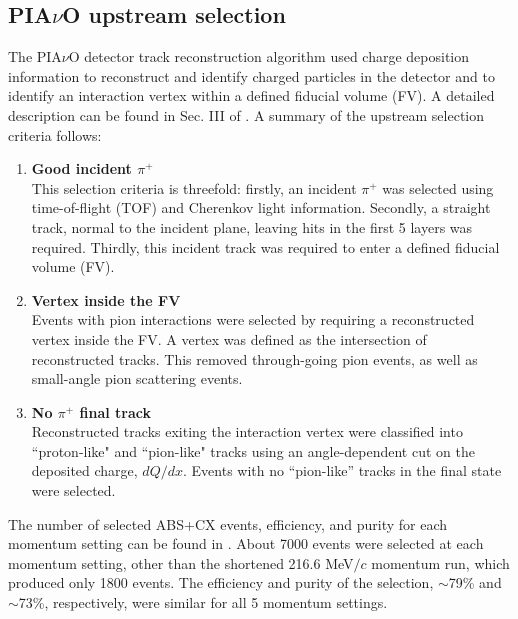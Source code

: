 \subsection{PIA$\nu$O upstream selection}
The PIA$\nu$O detector track reconstruction algorithm used charge deposition information to reconstruct and identify charged particles in the detector and to identify an interaction vertex within a defined fiducial volume (FV). A detailed description can be found in Sec. III of \cite{duet}. A summary of the upstream selection criteria follows:
\begin{enumerate}
\item {\bf Good incident $\pi^{+}$\\}
This selection criteria is threefold: firstly, an incident $\pi^{+}$ was selected using {\color{red}time-of-flight} (TOF) and Cherenkov light information. Secondly, a straight track, normal to the incident plane, leaving hits in the first 5 layers was required. Thirdly, this incident track was required to enter a defined fiducial volume (FV).
\item {\bf Vertex inside the FV\\}
Events with pion interactions were selected by requiring a reconstructed vertex inside the FV.  A vertex was defined as the intersection of reconstructed tracks. This removed through-going pion events, as well as small-angle pion scattering events.
\item {\bf No $\pi^{+}$ final track\\}
Reconstructed tracks exiting the interaction vertex were classified into ``proton-like" and ``pion-like" tracks using an angle-dependent cut on the deposited charge, $dQ/dx$. Events with no ``pion-like'' tracks in the final state were selected.
\end{enumerate}
The number of selected ABS+CX events, efficiency, and purity for each momentum setting can be found in \cite{duet}. About 7000 events were selected at each momentum setting, other than the shortened 216.6 MeV$/c$ momentum run, which produced only 1800 events. The efficiency and purity of the selection, $\sim$79\% and $\sim$73\%, respectively, were similar for all 5 momentum settings.

